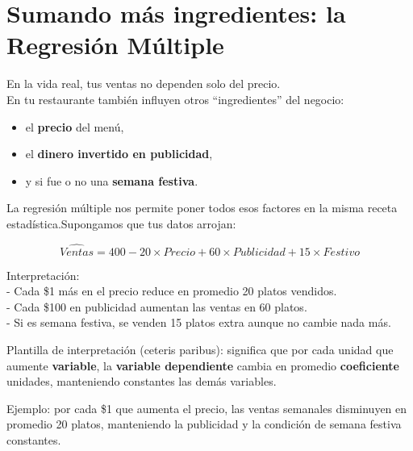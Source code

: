 \documentclass[
  spanish,
  letterpaper,
  DIV=11,
  numbers=noendperiod]{scrreprt}
\providecommand{\tightlist}{%
  \setlength{\itemsep}{0pt}\setlength{\parskip}{0pt}}
\begin{document}
\section{Sumando más ingredientes: la Regresión
Múltiple}\label{sumando-muxe1s-ingredientes-la-regresiuxf3n-muxfaltiple}

En la vida real, tus ventas no dependen solo del precio.\\
En tu restaurante también influyen otros ``ingredientes'' del negocio:

\begin{itemize}
\tightlist
\item
  el \textbf{precio} del menú,\\
\item
  el \textbf{dinero invertido en publicidad},\\
\item
  y si fue o no una \textbf{semana festiva}.
\end{itemize}

La regresión múltiple nos permite poner todos esos factores en la misma
receta estadística.Supongamos que tus datos arrojan:

\[
\hat{Ventas} = 400 - 20 \times Precio + 60 \times Publicidad + 15 \times Festivo
\]

Interpretación:\\
- Cada \$1 más en el precio reduce en promedio 20 platos vendidos.\\
- Cada \$100 en publicidad aumentan las ventas en 60 platos.\\
- Si es semana festiva, se venden 15 platos extra aunque no cambie nada
más.

\begin{tcolorbox}[enhanced jigsaw, toptitle=1mm, opacitybacktitle=0.6, leftrule=.75mm, arc=.35mm, title=\textcolor{quarto-callout-tip-color}{\faLightbulb}\hspace{0.5em}{Tip}, colback=white, bottomrule=.15mm, colbacktitle=quarto-callout-tip-color!10!white, opacityback=0, bottomtitle=1mm, breakable, rightrule=.15mm, coltitle=black, left=2mm, titlerule=0mm, colframe=quarto-callout-tip-color-frame, toprule=.15mm]

Plantilla de interpretación (ceteris paribus): significa que por cada
unidad que aumente \textbf{variable}, la \textbf{variable dependiente}
cambia en promedio \textbf{coeficiente} unidades, manteniendo constantes
las demás variables.

Ejemplo: por cada \$1 que aumenta el precio, las ventas semanales
disminuyen en promedio 20 platos, manteniendo la publicidad y la
condición de semana festiva constantes.

\end{tcolorbox}
\end{document}

